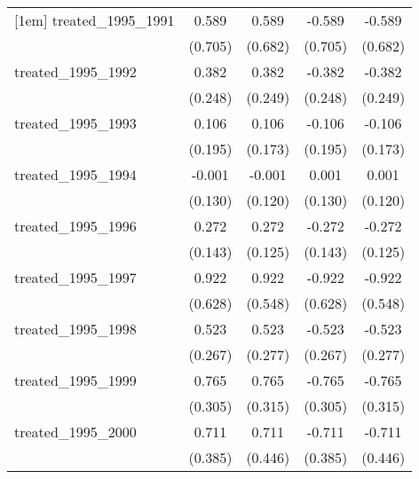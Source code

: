 {\begin{tabular}{l*{4}{c}}
[1em]
treated\_1995\_1991&       0.589         &       0.589         &      -0.589         &      -0.589         \\
            &     (0.705)         &     (0.682)         &     (0.705)         &     (0.682)         \\
[1em]
treated\_1995\_1992&       0.382         &       0.382         &      -0.382         &      -0.382         \\
            &     (0.248)         &     (0.249)         &     (0.248)         &     (0.249)         \\
[1em]
treated\_1995\_1993&       0.106         &       0.106         &      -0.106         &      -0.106         \\
            &     (0.195)         &     (0.173)         &     (0.195)         &     (0.173)         \\
[1em]
treated\_1995\_1994&      -0.001         &      -0.001         &       0.001         &       0.001         \\
            &     (0.130)         &     (0.120)         &     (0.130)         &     (0.120)         \\
[1em]
treated\_1995\_1996&       0.272         &       0.272\sym{*}  &      -0.272         &      -0.272\sym{*}  \\
            &     (0.143)         &     (0.125)         &     (0.143)         &     (0.125)         \\
[1em]
treated\_1995\_1997&       0.922         &       0.922         &      -0.922         &      -0.922         \\
            &     (0.628)         &     (0.548)         &     (0.628)         &     (0.548)         \\
[1em]
treated\_1995\_1998&       0.523         &       0.523         &      -0.523         &      -0.523         \\
            &     (0.267)         &     (0.277)         &     (0.267)         &     (0.277)         \\
[1em]
treated\_1995\_1999&       0.765\sym{*}  &       0.765\sym{*}  &      -0.765\sym{*}  &      -0.765\sym{*}  \\
            &     (0.305)         &     (0.315)         &     (0.305)         &     (0.315)         \\
[1em]
treated\_1995\_2000&       0.711         &       0.711         &      -0.711         &      -0.711         \\
            &     (0.385)         &     (0.446)         &     (0.385)         &     (0.446)         \\

\end{tabular}}
